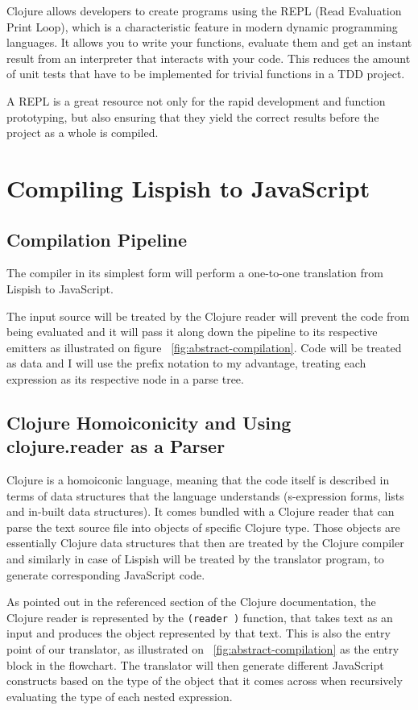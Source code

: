 Clojure allows developers to create programs using the REPL (Read Evaluation Print Loop), which is a characteristic feature in modern dynamic programming languages. It allows you to write your functions, evaluate them and get an instant result from an interpreter that interacts with your code. This reduces the amount of unit tests that have to be implemented for trivial functions in a TDD project. 

A REPL is a great resource not only for the rapid development and function prototyping, but also ensuring that they yield the correct results before the project as a whole is compiled.

\section{Compiling Lispish to JavaScript}

\subsection{Compilation Pipeline}



The compiler in its simplest form will perform a one-to-one translation from Lispish to JavaScript. 

The input source will be treated by the Clojure reader will prevent the code from being evaluated and it will pass it along down the pipeline to its respective emitters as illustrated on figure ~\ref{fig:abstract-compilation}. Code will be treated as data and I will use the prefix notation to my advantage, treating each expression as its respective node in a parse tree. 

\subsection{Clojure Homoiconicity and Using clojure.reader as a Parser}
Clojure is a homoiconic language, meaning that the code itself is described in terms of data structures that the language understands (s-expression forms, lists and in-built data structures). It comes bundled with a Clojure reader \cite{clojure.reader} that can parse the text source file into objects of specific Clojure type. Those objects are essentially Clojure data structures that then are treated by the Clojure compiler and similarly in case of Lispish will be treated by the translator program, to generate corresponding JavaScript code. 

As pointed out in the referenced \cite{clojure.reader} section of the Clojure documentation, the Clojure reader is represented by the \texttt{(reader )} function, that takes text as an input and produces the object represented by that text. 
This is also the entry point of our translator, as illustrated on ~\ref{fig:abstract-compilation} as the entry block in the flowchart. 
The translator will then generate different JavaScript constructs based on the type of the object that it comes across when recursively evaluating the type of each nested expression. 
